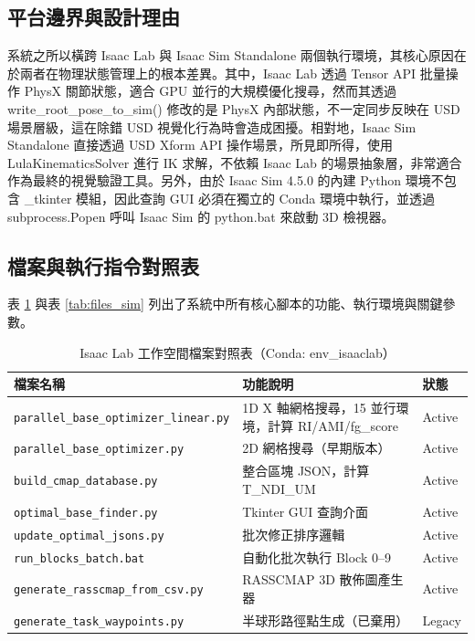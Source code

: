 \documentclass[a4paper, 12pt]{article}
\begin{document}
\subsection{平台邊界與設計理由}
\label{subsec:platform_boundary}

系統之所以橫跨 Isaac Lab 與 Isaac Sim Standalone 兩個執行環境，其核心原因在於兩者在物理狀態管理上的根本差異。其中，Isaac Lab 透過 Tensor API 批量操作 PhysX 關節狀態，適合 GPU 並行的大規模優化搜尋，然而其透過 write\_root\_pose\_to\_sim() 修改的是 PhysX 內部狀態，不一定同步反映在 USD 場景層級，這在除錯 USD 視覺化行為時會造成困擾。相對地，Isaac Sim Standalone 直接透過 USD Xform API 操作場景，所見即所得，使用 LulaKinematicsSolver 進行 IK 求解，不依賴 Isaac Lab 的場景抽象層，非常適合作為最終的視覺驗證工具。另外，由於 Isaac Sim 4.5.0 的內建 Python 環境不包含 \_tkinter 模組，因此查詢 GUI 必須在獨立的 Conda 環境中執行，並透過 subprocess.Popen 呼叫 Isaac Sim 的 python.bat 來啟動 3D 檢視器。

\subsection{檔案與執行指令對照表}
\label{subsec:file_reference}

表 \ref{tab:files_lab} 與表 \ref{tab:files_sim} 列出了系統中所有核心腳本的功能、執行環境與關鍵參數。

\begin{table}[H]
\centering
\caption{Isaac Lab 工作空間檔案對照表（Conda: env\_isaaclab）}
\label{tab:files_lab}
\small
\begin{tabularx}{\textwidth}{l X l}
\toprule
\textbf{檔案名稱} & \textbf{功能說明} & \textbf{狀態} \\
\midrule
\texttt{parallel\_base\_optimizer\_linear.py} & 1D X 軸網格搜尋，15 並行環境，計算 RI/AMI/fg\_score & Active \\
\texttt{parallel\_base\_optimizer.py} & 2D 網格搜尋（早期版本） & Active \\
\texttt{build\_cmap\_database.py} & 整合區塊 JSON，計算 T\_NDI\_UM & Active \\
\texttt{optimal\_base\_finder.py} & Tkinter GUI 查詢介面 & Active \\
\texttt{update\_optimal\_jsons.py} & 批次修正排序邏輯 & Active \\
\texttt{run\_blocks\_batch.bat} & 自動化批次執行 Block 0--9 & Active \\
\texttt{generate\_rasscmap\_from\_csv.py} & RASSCMAP 3D 散佈圖產生器 & Active \\
\texttt{generate\_task\_waypoints.py} & 半球形路徑點生成（已棄用） & Legacy \\
\bottomrule
\end{tabularx}
\end{table}
\end{document}
